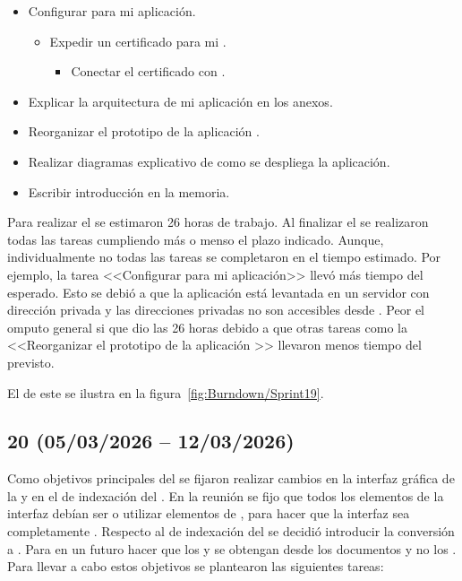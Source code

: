 \begin{itemize}
\tightlist
	\item Configurar  para mi aplicación. 
	\begin{itemize}
	\tightlist
		\item Expedir un certificado  para mi .
		\begin{itemize}
		\tightlist
			\item Conectar el certificado  con .
		\end{itemize}
	\end{itemize}
	\item Explicar la arquitectura de mi aplicación en los anexos.
	\item Reorganizar el prototipo de la aplicación .
	\item Realizar diagramas explicativo de como se despliega la aplicación.
	\item Escribir introducción en la memoria.
\end{itemize}

Para realizar el  se estimaron 26 horas de trabajo. Al finalizar el  se realizaron todas las tareas cumpliendo más o menso el plazo indicado. Aunque, individualmente no todas las tareas se completaron en el tiempo estimado. Por ejemplo, la tarea <<Configurar  para mi aplicación>> llevó más tiempo del esperado. Esto se debió a que la aplicación está levantada en un servidor con dirección privada y las direcciones privadas no son accesibles desde . Peor el omputo general si que dio las 26 horas debido a que otras tareas como la <<Reorganizar el prototipo de la aplicación >> llevaron menos tiempo del previsto. 

El  de este  se ilustra en la figura~\ref{fig:Burndown/Sprint19}.

\subsection{ 20 (05/03/2026 -- 12/03/2026)}
Como objetivos principales del  se fijaron realizar cambios en la interfaz gráfica de la  y en el  de indexación del . En la reunión se fijo que todos los elementos de la interfaz debían ser o utilizar elementos de , para hacer que la interfaz sea completamente . Respecto al  de indexación del  se decidió introducir la conversión a . Para en un futuro  hacer que los  y  se obtengan desde los documentos  y no los . Para llevar a cabo estos objetivos se plantearon las siguientes tareas:


